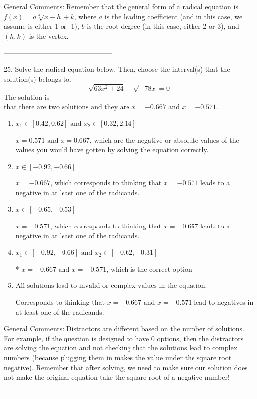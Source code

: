 \documentclass{article}[14pt]
\begin{document}
General Comments: Remember that the general form of a radical equation is $ f(x) = a \sqrt[b]{x - h} + k $, where $a$ is the leading coefficient (and in this case, we assume is either 1 or -1), $b$ is the root degree (in this case, either 2 or 3), and $(h, k)$ is the vertex.

-----------------------------------------------

25. Solve the radical equation below. Then, choose the interval(s) that the solution(s) belongs to.
$$ \sqrt{63 x^2 + 24} - \sqrt{-78 x} = 0 $$ 
The solution is $ \text{that there are two solutions and they are } x = -0.667 \text{ and } x = -0.571. $ 

\begin{enumerate}[label=\Alph*.] 
\item $ x_1 \in [0.42, 0.62] \text{ and } x_2 \in [0.32,2.14] $ 

 $x = 0.571 \text{ and } x = 0.667$, which are the negative or absolute values of the values you would have gotten by solving the equation correctly. 
\item $ x \in [-0.92,-0.66] $ 

 $x = -0.667$, which corresponds to thinking that $x = -0.571$ leads to a negative in at least one of the radicands. 
\item $ x \in [-0.65,-0.53] $ 

 $x = -0.571$, which corresponds to thinking that $x = -0.667$ leads to a negative in at least one of the radicands. 
\item $ x_1 \in [-0.92, -0.66] \text{ and } x_2 \in [-0.62,-0.31] $ 

 * $x = -0.667 \text{ and } x = -0.571$, which is the correct option. 
\item $ \text{All solutions lead to invalid or complex values in the equation.} $ 

 Corresponds to thinking that $x = -0.667 \text{ and } x = -0.571$ lead to negatives in at least one of the radicands. 
\end{enumerate} 
 
General Comments: Distractors are different based on the number of solutions. For example, if the question is designed to have 0 options, then the distractors are solving the equation and not checking that the solutions lead to complex numbers (because plugging them in makes the value under the square root negative). Remember that after solving, we need to make sure our solution does not make the original equation take the square root of a negative number!

-----------------------------------------------
\end{document}
